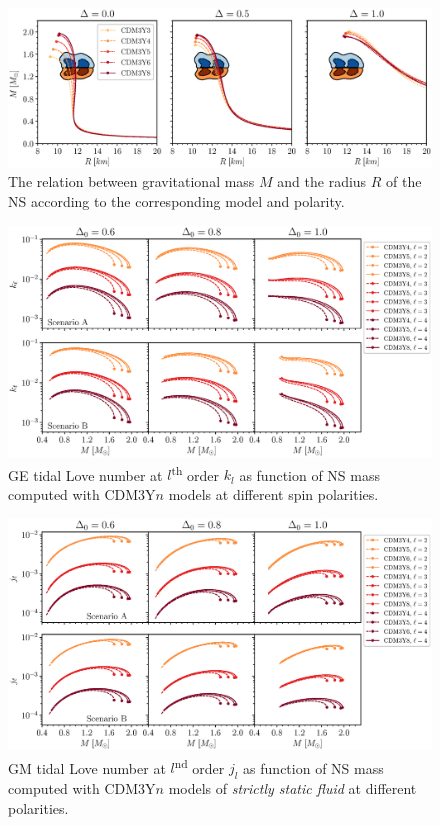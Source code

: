 \begin{figure}[ht!]
        \centering
        \includegraphics[width=\textwidth]{fig/MR.eps}
        \caption{The relation between gravitational mass $M$ and the radius $R$ of the \gls{NS} according to the corresponding model and polarity.}
        \label{fig:mr}
\end{figure} 
\begin{figure}[ht!]
        \centering
        \includegraphics[width=\textwidth]{fig/kl.eps}
        \caption{\gls{GE} tidal Love number at $l$\textsuperscript{th} order $k_l$ as function of \gls{NS} mass computed with CDM3Y$n$ models at different spin polarities.}
        \label{fig:kl}
\end{figure} 
\begin{figure}[ht!]
        \centering
        \includegraphics[width=\textwidth]{fig/jl_stat.eps}
        \caption{\gls{GM} tidal Love number at $l$\textsuperscript{nd} order $j_l$ as function of \gls{NS} mass computed with CDM3Y$n$ models of \emph{strictly static fluid} at different polarities.}
        \label{fig:jl_stat}
\end{figure} 
